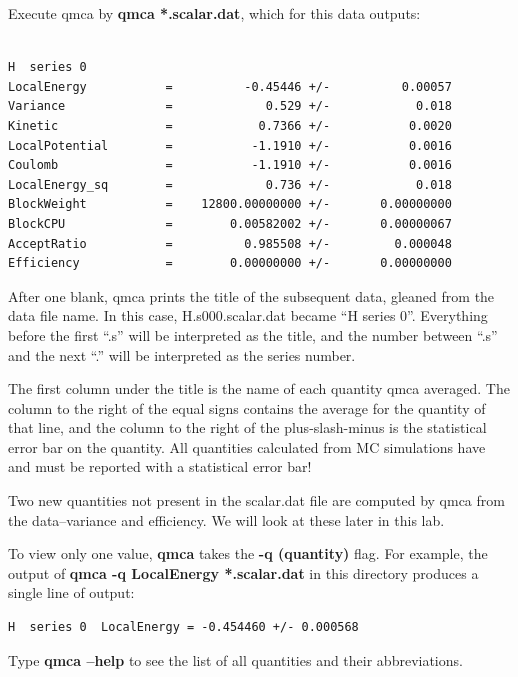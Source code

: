Execute qmca by \textbf{qmca *.scalar.dat}, which for this data outputs:

\begin{shaded} 
\begin{verbatim}

H  series 0 
LocalEnergy           =          -0.45446 +/-          0.00057
Variance              =             0.529 +/-            0.018 
Kinetic               =            0.7366 +/-           0.0020
LocalPotential        =           -1.1910 +/-           0.0016
Coulomb               =           -1.1910 +/-           0.0016 
LocalEnergy_sq        =             0.736 +/-            0.018
BlockWeight           =    12800.00000000 +/-       0.00000000
BlockCPU              =        0.00582002 +/-       0.00000067 
AcceptRatio           =          0.985508 +/-         0.000048
Efficiency            =        0.00000000 +/-       0.00000000 
\end{verbatim} 
\end{shaded}

After one blank, qmca prints the title of the subsequent data, gleaned from the
data file name.  In this case, H.s000.scalar.dat became ``H  series 0''.
Everything before the first ``.s'' will be interpreted as the title, and the
number between ``.s'' and the next ``.'' will be interpreted as the series
number. 

The first column under the title is the name of each quantity qmca averaged.
The column to the right of the equal signs contains the average for the
quantity of that line, and the column to the right of the plus-slash-minus is
the statistical error bar on the quantity.  All quantities calculated from MC
simulations have and must be reported with a statistical error bar!

Two new quantities not present in the scalar.dat file are computed by qmca from
the data--variance and efficiency.  We will look at these later in this lab. 

To view only one value, \textbf{qmca} takes the \textbf{-q (quantity)} flag.
For example, the output of \textbf{qmca -q LocalEnergy *.scalar.dat} in this
directory produces a single line of output:

\begin{shaded} 
\begin{verbatim} 
H  series 0  LocalEnergy = -0.454460 +/- 0.000568 
\end{verbatim} 
\end{shaded}

Type \textbf{qmca --help} to see the list of all quantities and their
abbreviations.

